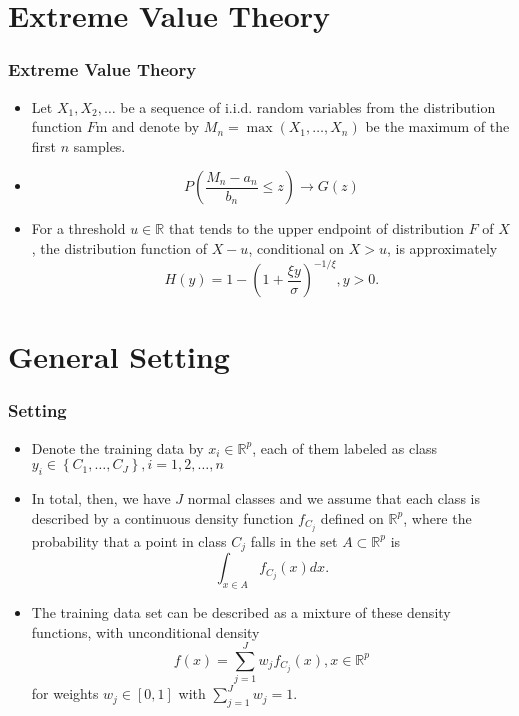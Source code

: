 \documentclass{beamer}
\newcommand{\suit}[1]{\left(#1\right)}
\newcommand{\set}[1]{\left\{#1\right\}}
\begin{document}
\section{Extreme Value Theory}

\begin{frame}
    \frametitle{Extreme Value Theory}
\begin{itemize}
    \item Let $X_1,X_2,\dots$ be a sequence of i.i.d. random variables from the distribution function $F$m and denote by $M_n =\max(X_1,\dots,X_n)$ be the maximum of the first $n$ samples.
    \item  
    $$
P\suit{\frac{M_n-a_n}{b_n}\le z}\to G(z)
    $$
    
    \item For a threshold $u\in \mathbb{R}$ that tends to the upper endpoint of distribution $F$ of $X$, the distribution function of $X-u$, conditional on $X>u$, is approximately 
    $$
    H(y) = 1- \suit{1+\frac{\xi y}{\sigma}}^{-1/\xi}, y>0.
    $$
\end{itemize}
    

\end{frame}

\section{General Setting}

\begin{frame}
    \frametitle{Setting }
\begin{itemize}
    \item Denote the training data by $x_i \in \mathbb{R}^p$, each of them labeled as class $y_i\in \set{C_1,\dots,C_J}, i=1,2,\dots,n$
    \item In total, then, we have $J$ normal classes and we assume that each class is described by a continuous density function $f_{C_j}$ defined on $\mathbb{R}^p$, where the probability that a point in class $C_j$ falls in the set $A\subset \mathbb{R}^p$ is 
    $$
        \int_{x\in A} f_{C_j}(x)dx.
    $$
    \item The training data set can be described as a mixture of these density functions, with unconditional density 
    $$
        f(x) = \sum_{j=1}^J w_j f_{C_j}(x), x\in \mathbb{R}^p
    $$
    for weights $w_j \in [0,1]$ with $\sum_{j=1}^J w_j=1$.
\end{itemize}
    

\end{frame}
\end{document}

